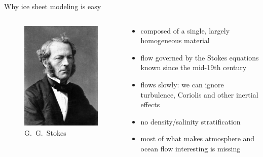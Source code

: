 \documentclass[hide notes,intlimits,unknownkeysallowed]{beamer}
\begin{document}
\begin{frame}{Why ice sheet modeling is easy}
  \begin{columns}[c]
    \begin{column}{.28\linewidth}
      \begin{figure}
        \includegraphics[width=\linewidth]{ggstokes}
        \\ \scriptsize{G.~G.~Stokes}
      \end{figure}
    \end{column}
    \begin{column}{.67\linewidth}
      \begin{itemize}[<+- | alert@+>]
      \item composed of a single, largely homogeneous material
      \item flow governed by the Stokes equations known since the mid-19th century
      \item flows slowly: we can ignore turbulence, Coriolis and other inertial effects
      \item no density/salinity stratification
      \item most of what makes atmosphere and ocean flow interesting is missing
      \end{itemize}
    \end{column}
  \end{columns}
\end{frame}
\end{document}
